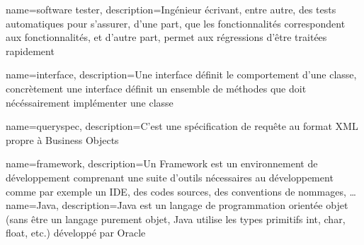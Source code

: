 {
	name={software tester},
	description={Ingénieur écrivant, entre autre, des tests automatiques pour s'assurer, d'une part, que les fonctionnalités correspondent aux fonctionnalités, et d'autre part, permet aux régressions d'être traitées rapidement}
}

{
	name={interface},
	description={Une interface définit le comportement d'une classe, concrètement une interface définit un ensemble de méthodes que doit nécéssairement implémenter une classe}
}

{
	name={queryspec},
	description={C'est une spécification de requête au format XML propre à Business Objects}
}

{
	name={framework},
	description={Un Framework est un environnement de développement comprenant une suite d'outils nécessaires au développement comme par exemple un IDE, des codes sources, des conventions de nommages, \ldots}
}
{
	name={Java},
	description={Java est un langage de programmation orientée objet (sans être un langage purement objet, Java utilise les types primitifs int, char, float, etc.) développé par Oracle}
}






